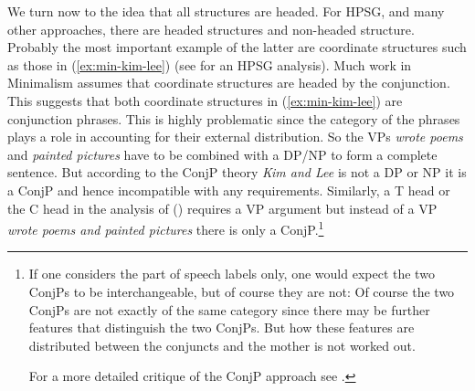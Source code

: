 \documentclass[output=paper]{langsci/langscibook}
\begin{document}
We turn now to the idea that all structures are headed. For HPSG, and many other approaches, there are headed structures and non-headed structure. Probably the most important example of the latter are coordinate structures such as those in (\ref{ex:min-kim-lee}) (see \citealt{Sag2003a-u} for an HPSG analysis).
\label{ex:min-kim-lee}
\z
Much work in Minimalism assumes that coordinate structures are headed by the conjunction. This
suggests that both coordinate structures in (\ref{ex:min-kim-lee}) are conjunction phrases. This is
highly problematic since the category of the phrases plays a role in accounting for their external
distribution. So the VPs \emph{wrote poems} and \emph{painted pictures} have to be combined with a
DP/NP to form a complete sentence. But according to the ConjP theory \emph{Kim and Lee} is not a DP
or NP it is a ConjP and hence incompatible with any requirements. Similarly, a T head or the C head
in the analysis of () requires a VP argument but instead of a VP \emph{wrote poems and painted pictures}
there is only a ConjP.\footnote{
If one considers the part of speech labels only, one would expect the two ConjPs to be interchangeable, but of course they are
not:
\label{ex:min-sang-dance}
\z
Of course the two ConjPs are not exactly of the same category since there may be further features that
distinguish the two ConjPs. But how these features are distributed between the conjuncts and the
mother is not worked out.

For a more detailed critique of the ConjP approach see \citet{Borsley2005a}.%
}
\end{document}
